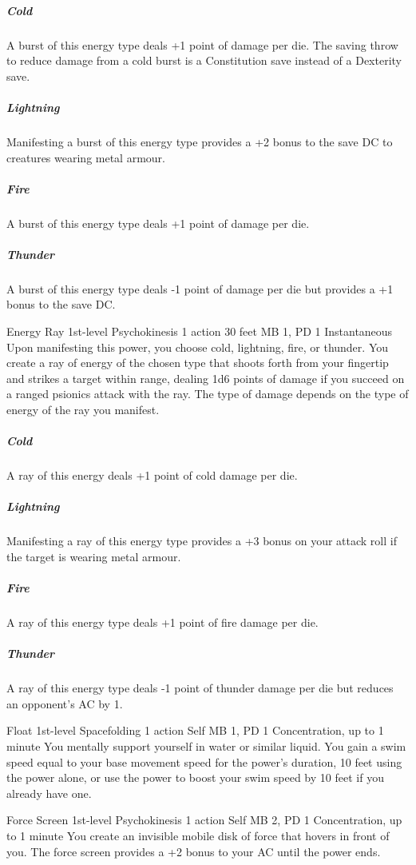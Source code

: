   \subparagraph{Cold}
  A burst of this energy type deals +1 point of damage per die.
  The saving throw to reduce damage from a cold burst
  is a Constitution save instead of a Dexterity save.
  
  \subparagraph{Lightning}
  Manifesting a burst of this energy type provides a +2 bonus
  to the save DC to creatures wearing metal armour.
  
  \subparagraph{Fire}
  A burst of this energy type deals +1 point of damage per die.
  
  \subparagraph{Thunder}
    A burst of this energy type deals -1 point of damage per die
    but provides a +1 bonus to the save DC.

\DndPowerHeader%
  {Energy Ray}
  {1st-level Psychokinesis}
  {1 action}
  {30 feet}
  {MB 1, PD 1}
  {Instantaneous}
Upon manifesting this power,
you choose cold, lightning, fire, or thunder.
You create a ray of energy of the chosen type that
shoots forth from your fingertip and strikes a target within range,
dealing 1d6 points of damage if you succeed on a
ranged psionics attack with the ray.
The type of damage depends on
the type of energy of the ray you manifest. 
  \subparagraph{Cold}
    A ray of this energy deals +1 point of cold damage per die.
  \subparagraph{Lightning}
    Manifesting a ray of this energy type provides a
    +3 bonus on your attack roll if the target is wearing metal armour.
  \subparagraph{Fire}
    A ray of this energy type deals +1 point of fire damage per die.
  \subparagraph{Thunder}
    A ray of this energy type deals -1 point of thunder damage per die
    but reduces an opponent's AC by 1.

\DndPowerHeader%
  {Float}
  {1st-level Spacefolding}
  {1 action}
  {Self}
  {MB 1, PD 1}
  {Concentration, up to 1 minute}
You mentally support yourself in water or similar liquid.
You gain a swim speed equal to your base movement speed for
the power's duration, 10 feet using the power alone,
or use the power to boost your swim speed by 10 feet if you already have one.

\DndPowerHeader%
  {Force Screen}
  {1st-level Psychokinesis}
  {1 action}
  {Self}
  {MB 2, PD 1}
  {Concentration, up to 1 minute}
You create an invisible mobile disk of force that hovers in front of you.
The force screen provides a +2 bonus to your AC until the power ends.

